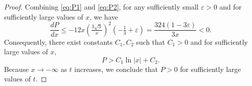 \documentclass{amsart}
\let\epsilon\varepsilon
\numberwithin{equation}{section}
\theoremstyle{plain}
\theoremstyle{definition}
\theoremstyle{remark}
\numberwithin{table}{section}
\newcommand{\of}[1]{\left( #1 \right)}
\begin{document}
\begin{proof}
        Combining \eqref{eq:P1} and \eqref{eq:P2}, for any sufficiently small $\epsilon>0$ and for sufficiently large values of $x$, we have 
        \[
            \frac{dP}{dx} \leq -12x \of{\tfrac{3\sqrt{3}}{x}}^2 \of{-\tfrac{1}{3}+\epsilon} = \frac{324 (1-3\epsilon)}{3x} < 0.
        \]
        Consequently, there exist constants $C_1, C_2$ such that $C_1>0$ and for sufficiently large values of $x$,
        \[P > C_1\ln |x|+C_2.\]
        Because $x\to -\infty$ as $t$ increases, we conclude that $P > 0$ for sufficiently large values of $t$.

\end{proof}
\end{document}
